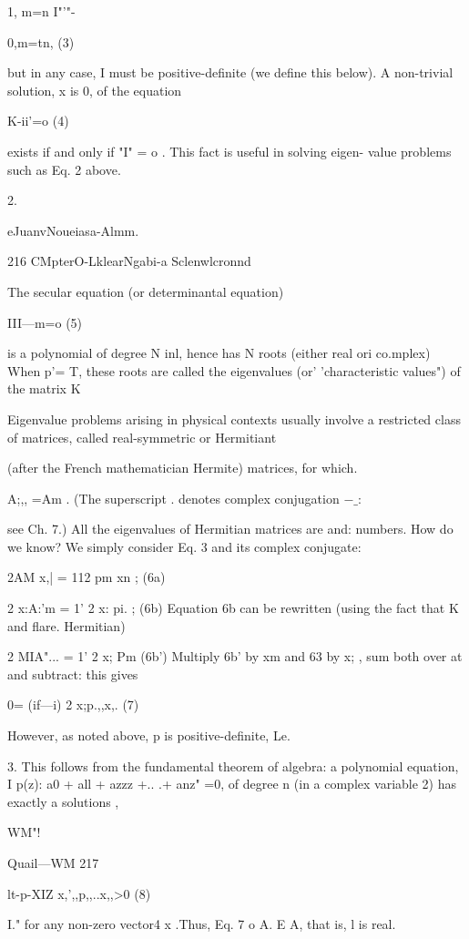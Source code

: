 1, m=n
I"'"-{0,m=tn, (3)

but in any case, I must be positive-definite (we define this
below). A non-trivial solution, x is 0, of the equation

K-ii'=o (4)

exists if and only if "I" = o . This fact is useful in solving eigen-
value problems such as Eq. 2 above.

 

2.

eJuanvNoueiasa-Almm.

216 CMpterO-LklearNgabi-a Sclenwlcronnd

The secular equation (or determinantal equation)

III—m=o (5)

is a polynomial of degree N inl, hence has N roots (either real ori
co.mplex) When p'= T, these roots are called the eigenvalues
(or' 'characteristic values") of the matrix K

Eigenvalue problems arising in physical contexts usually involve
a restricted class of matrices, called real-symmetric or Hermitiant

(after the French mathematician Hermite) matrices, for which.

A;,, =Am . (The superscript . denotes complex conjugation $-\_:$

see Ch. 7.) All the eigenvalues of Hermitian matrices are and:
numbers. How do we know? We simply consider Eq. 3 and its
complex conjugate:

 

2AM x,| = 112 pm xn ; (6a)

2 x:A:'m = 1' 2 x: pi. ; (6b)
Equation 6b can be rewritten (using the fact that K and flare.
Hermitian)

2 MIA"... = 1' 2 x; Pm (6b')
Multiply 6b' by xm and 63 by x; , sum both over at and subtract:
this gives

0= (if—i) 2 x;p.,,x,. (7)

However, as noted above, p is positive-definite, Le.

 

3. This follows from the fundamental theorem of algebra: a polynomial equation, I
p(z): a0 + all + azzz +.. .+ anz" =0, of degree n (in a complex variable 2) has exactly a solutions ,

WM"!

Quail—WM 217

lt-p-XIZ x,',,p,,..x,,>0 (8)

I."
for any non-zero vector4 x .Thus, Eq. 7 o A. E A, that is, l is real.

}
